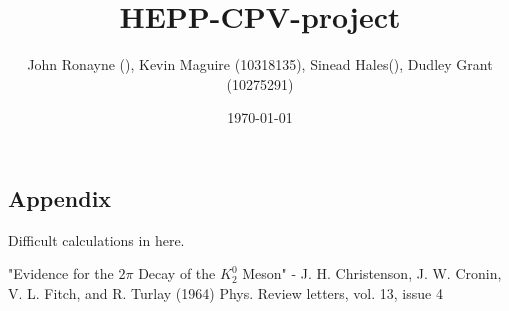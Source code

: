 \documentclass[floatfix,aps,prd,amsmath,amssymb]{revtex4}
\begin{document}
\title{HEPP-CPV-project}
\author{John Ronayne (), Kevin Maguire (10318135), Sinead Hales(), Dudley Grant (10275291)}
\date{\today}

\begin{abstract}
\textit{}
\end{abstract}

\maketitle
{}
 












\begin{appendix}
\section{Appendix}
Difficult calculations in here.
\end{appendix}
 
\begin{thebibliography}{10}
"Evidence for the $2 \pi$ Decay of the $K^0_2$ Meson" - J. H. Christenson, J. W. Cronin, V. L. Fitch, and R. Turlay (1964) Phys. Review letters, vol. 13, issue 4

\end{thebibliography}
\end{document}
